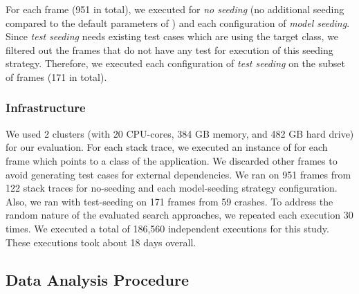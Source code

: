 For each frame (951 in total), we executed \botsing for \emph{no seeding} (\ie no additional seeding compared to the default parameters of \botsing) and each configuration of \emph{model seeding}. 
Since \emph{test seeding} needs existing test cases which are using the target class, we filtered out the frames that do not have any test for execution of this seeding strategy. Therefore, we executed each configuration of \emph{test seeding} on the subset of frames (171 in total). 


\subsubsection{Infrastructure}
\label{sec:setup:setup:infrst}
We used 2 clusters (with 20 CPU-cores, 384 GB memory, and 482 GB hard drive) for our evaluation. For each stack trace, we executed an instance of \botsing for each frame which points to a class of the application. We discarded other frames to avoid generating test cases for external dependencies. 
We ran \botsing on 951 frames from 122 stack traces for no-seeding and each model-seeding strategy configuration. Also, we ran \botsing with test-seeding on 171 frames from 59 crashes. To address the random nature of the evaluated search approaches, we repeated each execution 30 times.
We executed a total of 186,560 independent executions for this study. These executions took about 18 days overall.


\subsection{Data Analysis Procedure} 
\label{sec:setup:analyzing}

